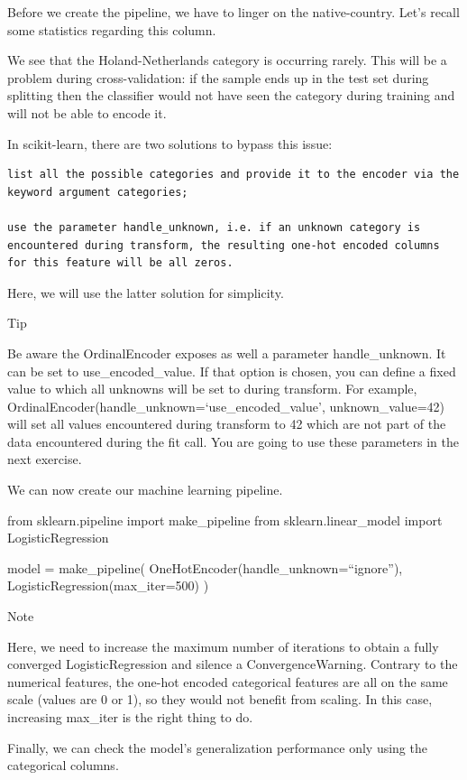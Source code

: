 \documentclass[
  letterpaper,
  DIV=11,
  numbers=noendperiod,
  oneside]{scrreprt}
\begin{document}
Before we create the pipeline, we have to linger on the native-country.
Let's recall some statistics regarding this column.

We see that the Holand-Netherlands category is occurring rarely. This
will be a problem during cross-validation: if the sample ends up in the
test set during splitting then the classifier would not have seen the
category during training and will not be able to encode it.

In scikit-learn, there are two solutions to bypass this issue:

\begin{verbatim}
list all the possible categories and provide it to the encoder via the keyword argument categories;

use the parameter handle_unknown, i.e. if an unknown category is encountered during transform, the resulting one-hot encoded columns for this feature will be all zeros.
\end{verbatim}

Here, we will use the latter solution for simplicity.

Tip

Be aware the OrdinalEncoder exposes as well a parameter handle\_unknown.
It can be set to use\_encoded\_value. If that option is chosen, you can
define a fixed value to which all unknowns will be set to during
transform. For example,
OrdinalEncoder(handle\_unknown=`use\_encoded\_value', unknown\_value=42)
will set all values encountered during transform to 42 which are not
part of the data encountered during the fit call. You are going to use
these parameters in the next exercise.

We can now create our machine learning pipeline.

from sklearn.pipeline import make\_pipeline from sklearn.linear\_model
import LogisticRegression

model = make\_pipeline( OneHotEncoder(handle\_unknown=``ignore''),
LogisticRegression(max\_iter=500) )

Note

Here, we need to increase the maximum number of iterations to obtain a
fully converged LogisticRegression and silence a ConvergenceWarning.
Contrary to the numerical features, the one-hot encoded categorical
features are all on the same scale (values are 0 or 1), so they would
not benefit from scaling. In this case, increasing max\_iter is the
right thing to do.

Finally, we can check the model's generalization performance only using
the categorical columns.
\end{document}
